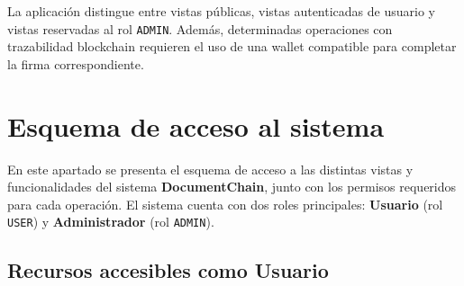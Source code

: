 \documentclass[11pt, a4paper]{article}
\begin{document}
La aplicación distingue entre vistas públicas, vistas autenticadas de usuario y vistas reservadas al rol \texttt{ADMIN}. Además, determinadas operaciones con trazabilidad blockchain requieren el uso de una wallet compatible para completar la firma correspondiente.


\section{Esquema de acceso al sistema}

En este apartado se presenta el esquema de acceso a las distintas vistas y funcionalidades del sistema \textbf{DocumentChain}, junto con los permisos requeridos para cada operación. El sistema cuenta con dos roles principales: \textbf{Usuario} (rol \texttt{USER}) y \textbf{Administrador} (rol \texttt{ADMIN}).

\subsection{Recursos accesibles como Usuario}
\end{document}

